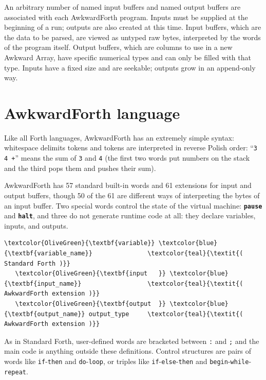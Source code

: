 \documentclass{webofc}
\begin{document}
An arbitrary number of named input buffers and named output buffers are associated with each AwkwardForth program. Inputs must be supplied at the beginning of a run; outputs are also created at this time. Input buffers, which are the data to be parsed, are viewed as untyped raw bytes, interpreted by the words of the program itself. Output buffers, which are columns to use in a new Awkward Array, have specific numerical types and can only be filled with that type. Inputs have a fixed size and are seekable; outputs grow in an append-only way.

\section{AwkwardForth language}

Like all Forth languages, AwkwardForth has an extremely simple syntax: whitespace delimits tokens and tokens are interpreted in reverse Polish order: ``\texttt{3 4 +}'' means the sum of \texttt{3} and \texttt{4} (the first two words put numbers on the stack and the third pops them and pushes their sum).

AwkwardForth has 57 standard built-in words and 61 extensions for input and output buffers, though 50 of the 61 are different ways of interpreting the bytes of an input buffer. Two special words control the state of the virtual machine: \textcolor{OliveGreen}{\tt\textbf{pause}} and \textcolor{OliveGreen}{\tt\textbf{halt}}, and three do not generate runtime code at all: they declare variables, inputs, and outputs.

\small
\begin{Verbatim}[commandchars=\\\{\}]
   \textcolor{OliveGreen}{\textbf{variable}} \textcolor{blue}{\textbf{variable_name}}               \textcolor{teal}{\textit{( Standard Forth )}}
   \textcolor{OliveGreen}{\textbf{input   }} \textcolor{blue}{\textbf{input_name}}                  \textcolor{teal}{\textit{( AwkwardForth extension )}}
   \textcolor{OliveGreen}{\textbf{output  }} \textcolor{blue}{\textbf{output_name}} output_type     \textcolor{teal}{\textit{( AwkwardForth extension )}}
\end{Verbatim}
\normalsize

As in Standard Forth, user-defined words are bracketed between \texttt{:} and \texttt{;} and the main code is anything outside these definitions. Control structures are pairs of words like \texttt{if}-\texttt{then} and \texttt{do}-\texttt{loop}, or triples like \texttt{if}-\texttt{else}-\texttt{then} and \texttt{begin}-\texttt{while}-\texttt{repeat}.
\end{document}
